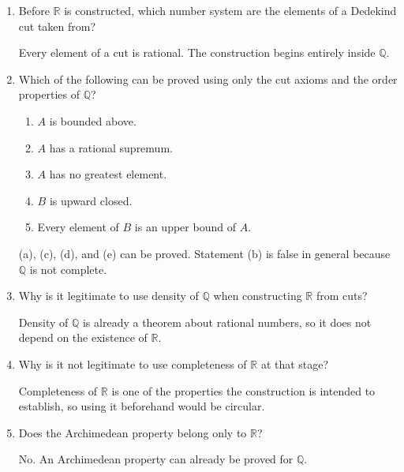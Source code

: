\documentclass{essay}
\begin{document}
\begin{enumerate}[label=\arabic*., itemsep=10pt]

\item Before $\mathbb{R}$ is constructed, which number system are the elements of a Dedekind cut taken from?

\begin{answer}
Every element of a cut is rational. The construction begins entirely inside $\mathbb{Q}$.
\end{answer}

\item Which of the following can be proved using only the cut axioms and the order properties of $\mathbb{Q}$?
\begin{enumerate}[label=(\alph*)]
\item $A$ is bounded above.
\item $A$ has a rational supremum.
\item $A$ has no greatest element.
\item $B$ is upward closed.
\item Every element of $B$ is an upper bound of $A$.
\end{enumerate}

\begin{answer}
(a), (c), (d), and (e) can be proved. Statement (b) is false in general because $\mathbb{Q}$ is not complete.
\end{answer}

\item Why is it legitimate to use density of $\mathbb{Q}$ when constructing $\mathbb{R}$ from cuts?

\begin{answer}
Density of $\mathbb{Q}$ is already a theorem about rational numbers, so it does not depend on the existence of $\mathbb{R}$.
\end{answer}

\item Why is it not legitimate to use completeness of $\mathbb{R}$ at that stage?

\begin{answer}
Completeness of $\mathbb{R}$ is one of the properties the construction is intended to establish, so using it beforehand would be circular.
\end{answer}

\item Does the Archimedean property belong only to $\mathbb{R}$?

\begin{answer}
No. An Archimedean property can already be proved for $\mathbb{Q}$.
\end{answer}


\end{enumerate}
\end{document}
